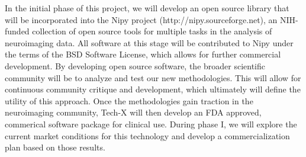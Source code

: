 \documentclass[10pt]{article}
\begin{document}
In the initial phase of this project, we will develop an open source
library that will be incorporated into the Nipy project
(http://nipy.sourceforge.net), an NIH-funded collection of open source
tools for multiple tasks in the analysis of neuroimaging data.  All
software at this stage will be contributed to Nipy under the terms of
the BSD Software License, which allows for further commercial
development. By developing open source software, the broader scientific
community will be to analyze and test our new methodologies. This will
allow for continuous community critique and development, which
ultimately will define the utility of this approach. Once the
methodologies gain traction in the neuroimaging community, Tech-X will
then develop an FDA approved, commerical software package for clinical
use. During phase I, we will explore the current market conditions for
this technology and develop a commercialization plan based on those
results.
\end{document}
